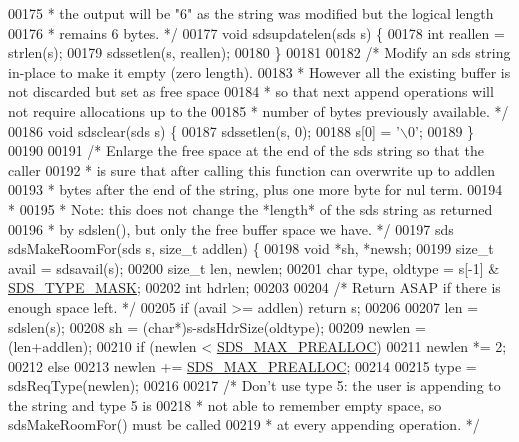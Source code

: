 \begin{DoxyCode}
{00175 \textcolor{comment}{ * the output will be "6" as the string was modified but the logical length}
00176 \textcolor{comment}{ * remains 6 bytes. */}
00177 \textcolor{keywordtype}{void} sdsupdatelen(sds s) \{
00178     \textcolor{keywordtype}{int} reallen = strlen(s);
00179     sdssetlen(s, reallen);
00180 \}
00181 
00182 \textcolor{comment}{/* Modify an sds string in-place to make it empty (zero length).}
00183 \textcolor{comment}{ * However all the existing buffer is not discarded but set as free space}
00184 \textcolor{comment}{ * so that next append operations will not require allocations up to the}
00185 \textcolor{comment}{ * number of bytes previously available. */}
00186 \textcolor{keywordtype}{void} sdsclear(sds s) \{
00187     sdssetlen(s, 0);
00188     s[0] = \textcolor{stringliteral}{'\(\backslash\)0'};
00189 \}
00190 
00191 \textcolor{comment}{/* Enlarge the free space at the end of the sds string so that the caller}
00192 \textcolor{comment}{ * is sure that after calling this function can overwrite up to addlen}
00193 \textcolor{comment}{ * bytes after the end of the string, plus one more byte for nul term.}
00194 \textcolor{comment}{ *}
00195 \textcolor{comment}{ * Note: this does not change the *length* of the sds string as returned}
00196 \textcolor{comment}{ * by sdslen(), but only the free buffer space we have. */}
00197 sds sdsMakeRoomFor(sds s, size\_t addlen) \{
00198     \textcolor{keywordtype}{void} *sh, *newsh;
00199     size\_t avail = sdsavail(s);
00200     size\_t len, newlen;
00201     \textcolor{keywordtype}{char} type, oldtype = s[-1] & \hyperlink{sds_8h_a07564783f389fdd7772a8f61d55d9ddf}{SDS\_TYPE\_MASK};
00202     \textcolor{keywordtype}{int} hdrlen;
00203 
00204     \textcolor{comment}{/* Return ASAP if there is enough space left. */}
00205     \textcolor{keywordflow}{if} (avail >= addlen) \textcolor{keywordflow}{return} s;
00206 
00207     len = sdslen(s);
00208     sh = (\textcolor{keywordtype}{char}*)s-sdsHdrSize(oldtype);
00209     newlen = (len+addlen);
00210     \textcolor{keywordflow}{if} (newlen < \hyperlink{sds_8h_a49abc7d19cee5062aa831429592cea71}{SDS\_MAX\_PREALLOC})
00211         newlen *= 2;
00212     \textcolor{keywordflow}{else}
00213         newlen += \hyperlink{sds_8h_a49abc7d19cee5062aa831429592cea71}{SDS\_MAX\_PREALLOC};
00214 
00215     type = sdsReqType(newlen);
00216 
00217     \textcolor{comment}{/* Don't use type 5: the user is appending to the string and type 5 is}
00218 \textcolor{comment}{     * not able to remember empty space, so sdsMakeRoomFor() must be called}
00219 \textcolor{comment}{     * at every appending operation. */}
}
\end{DoxyCode}
